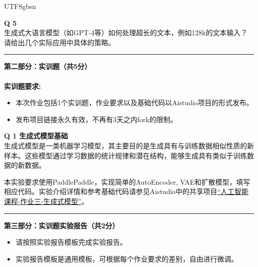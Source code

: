 \documentclass[a4paper, 11pt]{article}
\newenvironment{problem}[2][Q]
    { \begin{mdframed}[backgroundcolor=gray!20] \textbf{#1 #2} \\}
    {  \end{mdframed}}
\begin{document}
\begin{CJK}{UTF8}{gbsn}

\begin{problem}{5}
生成式大语言模型（如GPT-4等）如何处理超长的文本，例如128k的文本输入？请给出几个实际应用中具体的策略。
\end{problem}

\newpage
\noindent\rule{7in}{1pt}
\textbf{第二部分：实训题（共5分）}
\\ \\
\textbf{实训题要求:}
\begin{itemize}
    \item 本次作业包括1个实训题，作业要求以及基础代码以Aistudio项目的形式发布。
    \item 发布项目链接永久有效，不再有3天之内fork的限制。
\end{itemize}


\begin{problem}{1 生成式模型基础}

生成式模型是一类机器学习模型，其主要目的是生成具有与训练数据相似性质的新样本。这些模型通过学习数据的统计规律和潜在结构，能够生成具有类似于训练数据的新数据。

本实验要求使用PaddlePaddle，实现简单的AutoEncoder, VAE和扩散模型，填写相应代码。实验介绍详情和参考基础代码请参见Aistudio中的共享项目\href{https://aistudio.baidu.com/projectdetail/7517368}{“人工智能课程-作业三-生成式模型”}。

\end{problem}

\noindent\rule{7in}{1pt}
\textbf{第三部分：实训题实验报告（共2分）}
\begin{itemize}
    \item 请按照实验报告模板完成实验报告。
    \item 实验报告模板是通用模板，可根据每个作业要求的差别，自由进行微调。
\end{itemize}

\end{CJK}
\end{document}
